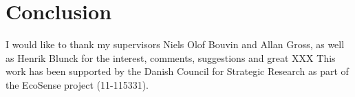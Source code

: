 \section{Conclusion}
I would like to thank my supervisors Niels Olof Bouvin and Allan Gross, as well as Henrik Blunck for the interest, comments, suggestions and great XXX
This work has been supported by the Danish Council for Strategic Research as part of the EcoSense project (11-115331).